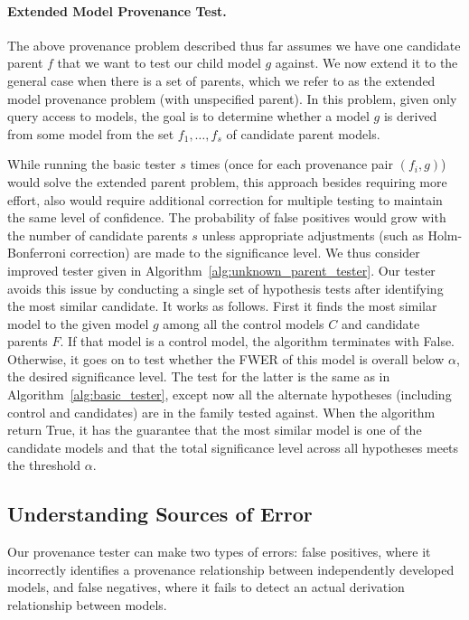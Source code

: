 


\paragraph{Extended Model Provenance Test.} The above provenance problem described thus far assumes we have one candidate parent $f$ that we want to test our child model $g$ against. 
We now extend it to the general case when there is a set of parents, which we refer to as the extended model provenance problem (with unspecified parent). In this problem, given only query access to models, the goal is to determine whether a model $g$ is derived from some model from the set ${f_1,\ldots,f_s}$ of candidate parent models.

While running the basic tester $s$ times (once for each provenance pair $(f_i,g)$) would solve the extended parent problem, this approach besides requiring more effort, also would require additional correction for multiple testing to maintain the same level of confidence. The probability of false positives would grow with the number of candidate parents $s$ unless appropriate adjustments (such as Holm-Bonferroni correction) are made to the significance level. 
%
We thus consider improved tester given in Algorithm~\ref{alg:unknown_parent_tester}. Our  tester avoids this issue by conducting a single set of hypothesis tests after identifying the most similar candidate.
%
It works as follows. First it finds the most similar model to the given model $g$ among all the control models $C$ and candidate parents $F$. If that model is a control model, the algorithm terminates with False. Otherwise, it goes on to test whether the FWER of this model is overall below $\alpha$, the desired significance level. The test for the latter is the same as in Algorithm~\ref{alg:basic_tester}, except now all the alternate hypotheses (including control and candidates) are in the family tested against. When the algorithm return True, it has the guarantee that the most similar model is one of the candidate models and that the total significance level across all hypotheses meets the threshold $\alpha$.



\subsection{Understanding Sources of Error}
\label{sec:analysis}

Our provenance tester can make two types of errors: false positives, where it incorrectly identifies a provenance relationship between independently developed models, and false negatives, where it fails to detect an actual derivation relationship between models. 

